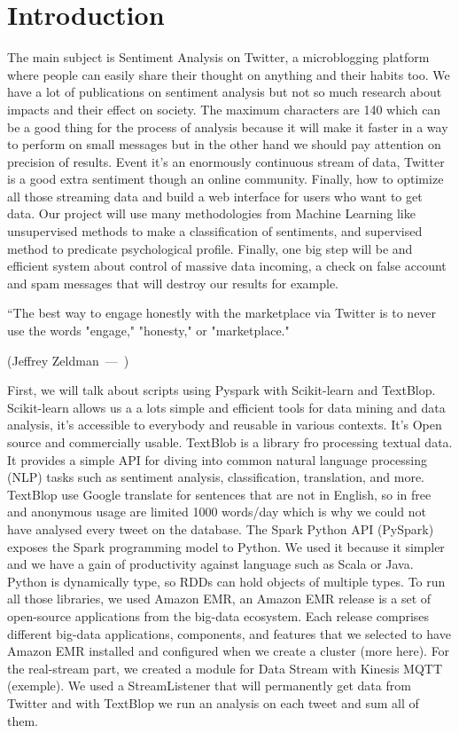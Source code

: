 \documentclass{acmtog} %
\let\oldquote\quote
\let\endoldquote\endquote
\renewenvironment{quote}[2][]
  {\if\relax\detokenize{#1}\relax
     \def\quoteauthor{#2}%
   \else
     \def\quoteauthor{#2~---~#1}%
   \fi
   \oldquote}
  {\par\nobreak\smallskip\hfill(\quoteauthor)%
   \endoldquote\addvspace{\bigskipamount}}
\begin{document}
\section{Introduction}
The main subject is Sentiment Analysis on Twitter, a microblogging platform where people can easily share their thought on anything and their habits too. We have a lot of publications on sentiment analysis but not so much research about impacts and their effect on society.
The maximum characters are 140 which can be a good thing for the process of analysis because it will make it faster in a way to perform on small messages but in the other hand we should pay attention on precision of results.
Event it’s an enormously continuous stream of data, Twitter is a good extra sentiment though an online community.  
Finally, how to optimize all those streaming data and build a web interface for users who want to get data.
Our project will use many methodologies from Machine Learning like unsupervised methods to make a classification of sentiments, and supervised method to predicate psychological profile.
Finally, one big step will be and efficient system about control of massive data incoming, a check on false account and spam messages that will destroy our results for example.
 
\begin{quote}{Jeffrey Zeldman}
“The best way to engage honestly with the marketplace via Twitter is to never use the words "engage," "honesty," or "marketplace." 
\end{quote}

First, we will talk \cite{Meisheri17} about scripts using Pyspark with Scikit-learn and TextBlop. 
Scikit-learn allows us a a lots simple and efficient tools for data mining and data analysis, it’s accessible to everybody and reusable in various contexts. It’s Open source and commercially usable.
TextBlob is a library fro processing textual data. It provides a simple API for diving into common natural language processing (NLP) tasks such as sentiment analysis, classification, translation, and more. TextBlop use Google translate for sentences that are not in English, so in free and anonymous usage are limited 1000 words/day which is why we could not have analysed every tweet on the database.
The Spark Python API (PySpark) exposes the Spark programming model to Python. We used it because it simpler and we have a gain of productivity against language such as Scala or Java. Python is dynamically type, so RDDs can hold objects of multiple types.
To run all those libraries, we used Amazon EMR, an Amazon EMR release is a set of open-source applications from the big-data ecosystem. Each release comprises different big-data applications, components, and features that we selected to have Amazon EMR installed and configured when we create a cluster (more here). 
For the real-stream part, we created a module for Data Stream with Kinesis MQTT (exemple). We used a StreamListener that will permanently get data from Twitter and with TextBlop we run an analysis on each tweet and sum all of them.
\end{document}
